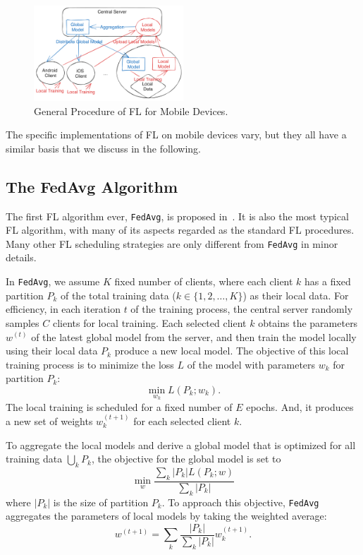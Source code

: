 \documentclass[conference]{IEEEtran}
\begin{document}
\begin{figure}
\centerline{
    \includegraphics[width=0.5\textwidth]{general-fl.png}
}
\caption{General Procedure of FL for Mobile Devices.}
\label{fig:general-fl}
\end{figure}

The specific implementations of FL on mobile devices vary,
but they all have a similar basis that we discuss in the following.

\subsection{The FedAvg Algorithm}

The first FL algorithm ever, \verb|FedAvg|,
is proposed in~\cite{mcmahan2017communication}.
It is also the most typical FL algorithm,
with many of its aspects regarded as the standard FL procedures.
Many other FL scheduling strategies are only different from \verb|FedAvg| in
minor details.

In \verb|FedAvg|,
we assume $K$ fixed number of clients,
where each client $k$ has a fixed partition $P_k$ of
the total training data ($k \in \{1, 2, \dots, K\}$) as their local data.
For efficiency,
in each iteration $t$ of the training process,
the central server randomly samples $C$ clients for local training.
Each selected client $k$ obtains the parameters $w^{(t)}$ of
the latest global model from the server,
and then train the model locally using their local data $P_k$
produce a new local model.
The objective of this local training process is to minimize the loss $L$ of
the model with parameters $w_k$ for partition $P_k$:
\begin{equation}
    \min_{w_k} L(P_k;w_k).
\end{equation}
The local training is scheduled for a fixed number of $E$ epochs.
And, it produces a new set of weights $w_k^{(t+1)}$ for
each selected client $k$.

To aggregate the local models and derive a global model that
is optimized for all training data $\bigcup_k P_k$,
the objective for the global model is set to
\begin{equation}
    \min_{w} \frac{\sum_k |P_k|L(P_k;w)}{\sum_k |P_k|}
\end{equation}
where $|P_k|$ is the size of partition $P_k$.
To approach this objective,
\verb|FedAvg| aggregates the parameters of local models by
taking the weighted average:
\begin{equation}
    w^{(t+1)}=\sum_k \frac{|P_k|}{\sum_k |P_k|}w_k^{(t+1)}.
\end{equation}
\end{document}
